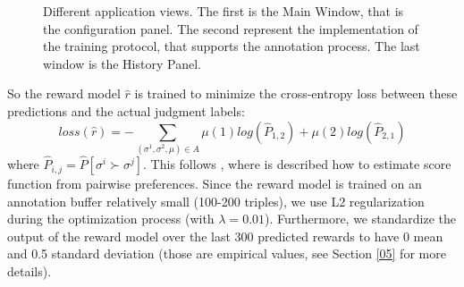 \begin{figure}[t]
    \qquad
	\caption{Different application views. The first is the Main Window, that is the configuration panel. The second represent the implementation of the training protocol, that supports the annotation process. The last window is the History Panel.}%
	\label{fig:Application}%
\end{figure}

So the reward model $\hat{r}$ is trained to minimize the cross-entropy loss between these predictions and the actual judgment labels:
\begin{equation}\label{eq:rewardloss}
    loss(\hat{r}) = - \sum_{(\sigma^1,\sigma^2,\mu)\in A} \mu(1)log(\hat{P}_{1,2}) + \mu(2)log(\hat{P}_{2,1})
\end{equation}
where $\hat{P}_{i,j} = \hat{P}[\sigma^i \succ \sigma^j]$. This follows \cite{10.1093/biomet/39.3-4.324}, where is described how to estimate score function from pairwise preferences. Since the reward model is trained on an annotation buffer relatively small (100-200 triples), we use L2 regularization during the optimization process (with $\lambda = 0.01$). Furthermore, we standardize the output of the reward model over the last 300 predicted rewards to have 0 mean and 0.5 standard deviation (those are empirical values, see Section \ref{05} for more details).


